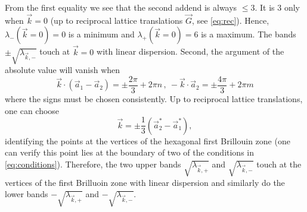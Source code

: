 \documentclass[prl,aps,twocolumn,showpacs,superscriptaddress,longbibliography]{revtex4-1}
\newcommand{\be}{\begin{equation}}
\newcommand{\ee}{\end{equation}}
\newcommand{\lt}{\left(}
\newcommand{\rt}{\right)}
\begin{document}
From the first equality we see that the second addend is always $\leq 3$. It is $3$ only when $\vec{k} = 0$ (up to reciprocal lattice translations $\vec{G}$, see \eqref{eq:rec}). Hence, $\lambda_- (\vec{k} = 0) = 0$ is a minimum and $\lambda_{+} (\vec{k}=0) = 6$ is a maximum. The bands $\pm \sqrt{\lambda_{\vec{k},-}}$ touch at $\vec{k} = 0$ with linear dispersion. Second, the argument of the absolute value will vanish when 
\be
	\vec{k} \cdot (\vec{a}_1 - \vec{a}_2) = \pm \frac{2\pi}{3} + 2\pi n \,, \ -\vec{k}\cdot \vec{a}_2 = \pm \frac{4\pi}{3} + 2\pi m   
\ee
where the signs must be chosen consistently. Up to reciprocal lattice translations, one can choose
\be
	\vec{k} = \pm\frac{1}{3} \lt \vec{a}_2^\ast - \vec{a}_1^\ast   \rt,
\ee
identifying the points at the vertices of the hexagonal first Brillouin zone (one can verify this point lies at the boundary of two of the conditions in \eqref{eq:conditions}). Therefore, the two upper bands $\sqrt{\lambda_{\vec{k},+}}$ and $\sqrt{\lambda_{\vec{k},-}}$ touch at the vertices of the first Brilluoin zone with linear dispersion and similarly do the lower bands $-\sqrt{\lambda_{\vec{k},+}}$ and $-\sqrt{\lambda_{\vec{k},-}}$. 
\end{document}
